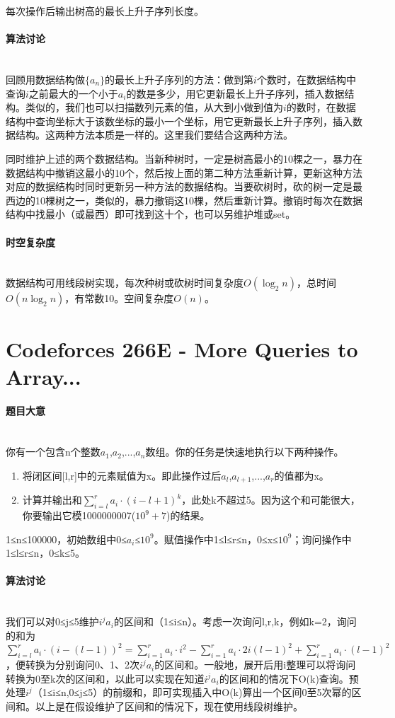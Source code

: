 \documentclass[UTF8]{ctexart}
\newcommand{\myparagraph}[1]{\paragraph{#1}\mbox{}\\}
\theoremstyle{nonumberplain}
\begin{document}
			每次操作后输出树高的最长上升子序列长度。
		
		\myparagraph{算法讨论}
		
			回顾用数据结构做$\{a_n\}$的最长上升子序列的方法：做到第$i$个数时，在数据结构中查询$i$之前最大的一个小于$a_i$的数是多少，用它更新最长上升子序列，插入数据结构。类似的，我们也可以扫描数列元素的值，从大到小做到值为$i$的数时，在数据结构中查询坐标大于该数坐标的最小一个坐标，用它更新最长上升子序列，插入数据结构。这两种方法本质是一样的。这里我们要结合这两种方法。
			
			同时维护上述的两个数据结构。当新种树时，一定是树高最小的10棵之一，暴力在数据结构中撤销这最小的10个，然后按上面的第二种方法重新计算，更新这种方法对应的数据结构时同时更新另一种方法的数据结构。当要砍树时，砍的树一定是最西边的10棵树之一，类似的，暴力撤销这10棵，然后重新计算。撤销时每次在数据结构中找最小（或最西）即可找到这十个，也可以另维护堆或set。
		
		\myparagraph{时空复杂度}
		
			数据结构可用线段树实现，每次种树或砍树时间复杂度$O(\log_2n)$，总时间$O(n\log_2n)$，有常数10。空间复杂度$O(n)$。
	
	\section{Codeforces 266E - More Queries to Array...}
	
		\myparagraph{题目大意}
		
			你有一个包含n个整数$a_1$,$a_2$,...,$a_n$数组。你的任务是快速地执行以下两种操作。
			
			\begin{enumerate}[leftmargin=15mm]
				\item 将闭区间{[l,r]}中的元素赋值为x。即此操作过后$a_l$,$a_{l+1}$,...,$a_r$的值都为x。
				\item 计算并输出和$\sum_{i=l}^r a_i \cdot (i-l+1)^k$，此处k不超过5。因为这个和可能很大，你要输出它模1000000007($10^9+7$)的结果。
			\end{enumerate}
			
			1≤n≤100000，初始数组中0≤$a_i$≤$10^9$。赋值操作中1≤l≤r≤n，0≤x≤$10^9$；询问操作中1≤l≤r≤n，0≤k≤5。
			
		\myparagraph{算法讨论}
		
			我们可以对0≤j≤5维护$i^j a_i$的区间和（1≤i≤n）。考虑一次询问l,r,k，例如k=2，询问的和为$\sum_{i=l}^r  a_i \cdot (i-(l-1))^2 = \sum_{i=1}^r  a_i \cdot i^2 - \sum_{i=1}^r  a_i \cdot 2i(l-1)^2 + \sum_{i=1}^r  a_i \cdot (l-1)^2$，便转换为分别询问0、1、2次$i^j a_i$的区间和。一般地，展开后用i整理可以将询问转换为0至k次的区间和，以此可以实现在知道$i^j a_i$的区间和的情况下O(k)查询。预处理$i^j$（1≤i≤n,0≤j≤5）的前缀和，即可实现插入中O(k)算出一个区间0至5次幂的区间和。以上是在假设维护了区间和的情况下，现在使用线段树维护。
			
\end{document}
